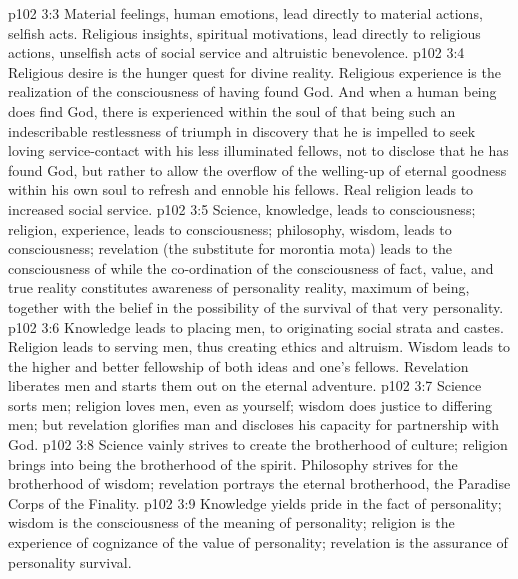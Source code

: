 \vs p102 3:3 Material feelings, human emotions, lead directly to material actions, selfish acts. Religious insights, spiritual motivations, lead directly to religious actions, unselfish acts of social service and altruistic benevolence.
\vs p102 3:4 Religious desire is the hunger quest for divine reality. Religious experience is the realization of the consciousness of having found God. And when a human being does find God, there is experienced within the soul of that being such an indescribable restlessness of triumph in discovery that he is impelled to seek loving service\hyp{}contact with his less illuminated fellows, not to disclose that he has found God, but rather to allow the overflow of the welling\hyp{}up of eternal goodness within his own soul to refresh and ennoble his fellows. Real religion leads to increased social service.
\vs p102 3:5 \pc Science, knowledge, leads to  consciousness; religion, experience, leads to  consciousness; philosophy, wisdom, leads to  consciousness; revelation (the substitute for morontia mota) leads to the consciousness of  while the co\hyp{}ordination of the consciousness of fact, value, and true reality constitutes awareness of personality reality, maximum of being, together with the belief in the possibility of the survival of that very personality.
\vs p102 3:6 \pc Knowledge leads to placing men, to originating social strata and castes. Religion leads to serving men, thus creating ethics and altruism. Wisdom leads to the higher and better fellowship of both ideas and one’s fellows. Revelation liberates men and starts them out on the eternal adventure.
\vs p102 3:7 Science sorts men; religion loves men, even as yourself; wisdom does justice to differing men; but revelation glorifies man and discloses his capacity for partnership with God.
\vs p102 3:8 Science vainly strives to create the brotherhood of culture; religion brings into being the brotherhood of the spirit. Philosophy strives for the brotherhood of wisdom; revelation portrays the eternal brotherhood, the Paradise Corps of the Finality.
\vs p102 3:9 Knowledge yields pride in the fact of personality; wisdom is the consciousness of the meaning of personality; religion is the experience of cognizance of the value of personality; revelation is the assurance of personality survival.

